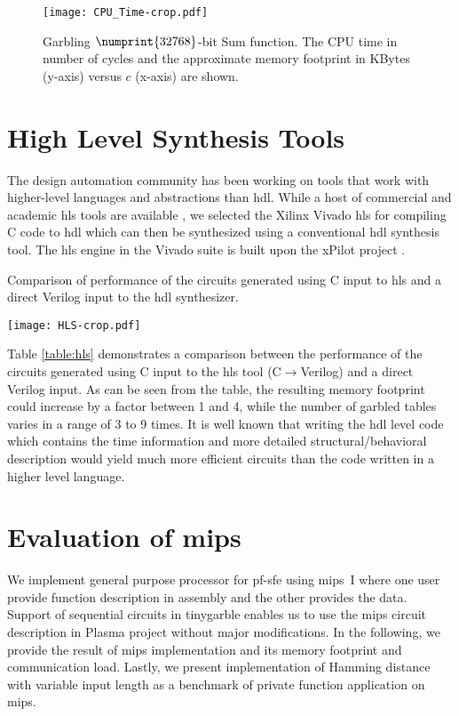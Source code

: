 \begin{figure}[ht]
	\centering
	\texttt{[image: CPU\_Time-crop.pdf]}
	\caption{Garbling $\numprint{32768}$-bit Sum function.
The CPU time in number of cycles and the approximate memory footprint in KBytes (y-axis) versus $c$ (x-axis) are shown.}
	\label{fig:cpu_time}
\end{figure}

\section{High Level Synthesis Tools}
The design automation community has been working on tools that work with higher-level languages and abstractions than \acrshort{hdl}.
While a host of commercial and academic \acrshort{hls} tools are available \cite{tool:Vivado, tool:PandA, decaluwe2004myhdl, Gupta2004}, we selected the Xilinx Vivado \acrshort{hls} for compiling C code to \acrshort{hdl} which can then be synthesized using a conventional \acrshort{hdl} synthesis tool.
The \acrshort{hls} engine in the Vivado suite is built upon the xPilot project \cite{Chapter:Zhang2008}.

\begin{table*}[t]
\centering
\caption{Comparison of performance of the circuits generated using C input to \acrshort{hls} and a direct Verilog input to the \acrshort{hdl} synthesizer.}
\label{table:hls}
\texttt{[image: HLS-crop.pdf]}
\end{table*}

Table \ref{table:hls} demonstrates a comparison between the performance of the circuits generated using C input to the \acrshort{hls} tool (C$\rightarrow$Verilog) and a direct Verilog input.
As can be seen from the table, the resulting memory footprint could increase by a factor between 1 and 4, while the number of garbled tables varies in a range of 3 to 9 times.
It is well known that writing the \acrshort{hdl} level code which contains the time information and more detailed structural/behavioral description would yield much more efficient circuits than the code written in a higher level language.

\section{Evaluation of \gls{mips}}
We implement general purpose processor for \acrshort{pf-sfe} using \gls{mips}~I where one user provide function description in assembly and the other provides the data.
Support of sequential circuits in \gls{tinygarble} enables us to use the \gls{mips} circuit description in Plasma project \cite{rhoads2006plasma} without major modifications.
In the following, we provide the result of \gls{mips} implementation and its memory footprint and communication load.
Lastly, we present implementation of Hamming distance with variable input length as a benchmark of private function application on \gls{mips}.

